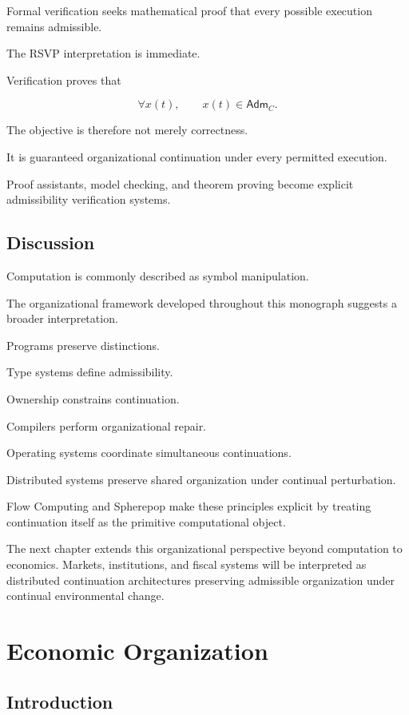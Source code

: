 \documentclass[11pt,oneside]{book}
\numberwithin{equation}{chapter}
\theoremstyle{definition}
\theoremstyle{plain}
\newcommand{\Adm}{\mathsf{Adm}}
\begin{document}
Formal verification seeks mathematical proof that every possible execution
remains admissible.

The RSVP interpretation is immediate.

Verification proves that

\[
\forall
x(t),
\qquad
x(t)
\in
\Adm_C.
\]

The objective is therefore not merely correctness.

It is guaranteed organizational continuation under every permitted
execution.

Proof assistants, model checking, and theorem proving become explicit
admissibility verification systems.

\section{Discussion}

Computation is commonly described as symbol manipulation.

The organizational framework developed throughout this monograph suggests a
broader interpretation.

Programs preserve distinctions.

Type systems define admissibility.

Ownership constrains continuation.

Compilers perform organizational repair.

Operating systems coordinate simultaneous continuations.

Distributed systems preserve shared organization under continual
perturbation.

Flow Computing and Spherepop make these principles explicit by treating
continuation itself as the primitive computational object.

The next chapter extends this organizational perspective beyond computation
to economics. Markets, institutions, and fiscal systems will be interpreted
as distributed continuation architectures preserving admissible
organization under continual environmental change.

\chapter{Economic Organization}

\section{Introduction}
\end{document}
